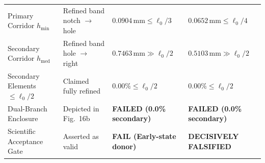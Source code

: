 \begin{table}[htbp]
\begin{tabularx}{\textwidth}{lXXX}
Primary Corridor $h_{\min}$ & Refined band notch $\to$ hole & $0.0904\,\mathrm{mm} \le \ell_0/3$ & $0.0652\,\mathrm{mm} \le \ell_0/4$ \\
Secondary Corridor $h_{\mathrm{med}}$ & Refined band hole $\to$ right & $0.7463\,\mathrm{mm} \gg \ell_0/2$ & $0.5103\,\mathrm{mm} \gg \ell_0/2$ \\
Secondary Elements $\le \ell_0/2$ & Claimed fully refined & \textbf{$\mathbf{0.00\%} \le \ell_0/2$} & \textbf{$\mathbf{0.00\%} \le \ell_0/2$} \\
Dual-Branch Enclosure & Depicted in Fig.~16b & \textbf{FAILED (0.0\% secondary)} & \textbf{FAILED (0.0\% secondary)} \\
Scientific Acceptance Gate & Asserted as valid & \textbf{FAIL (Early-state donor)} & \textbf{DECISIVELY FALSIFIED} \\
\hline
\end{tabularx}
\end{table}

